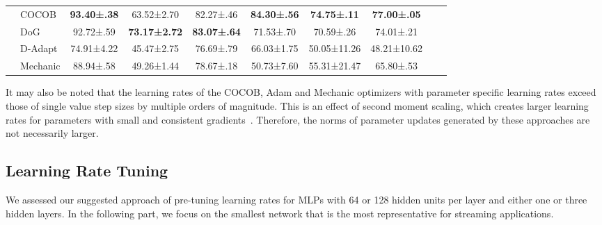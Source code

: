 \documentclass[runningheads]{llncs}
\begin{document}
\begin{table}[ht]
\begin{tabular}{llcccccccc}
		\multirow{4}{*}{\rotatebox[origin=c]{90}{LR-Free}} & COCOB                               \cite{orabonaTrainingDeepNetworks2017}        & \bfseries 93.40±.38 & 63.52±2.70           & 82.27±.46             & \bfseries 84.30±.56  & \bfseries 74.75±.11 & \bfseries 77.00±.05 \\
		                                                   & DoG \cite{ivgiDoGSGDBest2023}                                                     & 92.72±.59           & \bfseries 73.17±2.72 & \bfseries 83.07±.64   & 71.53±.70            & 70.59±.26           & 74.01±.21           \\
		                                                   & D-Adapt                    \cite{defazioLearningRateFreeLearningDAdaptation2023a} & 74.91±4.22          & 45.47±2.75           & 76.69±.79             & 66.03±1.75           & 50.05±11.26         & 48.21±10.62         \\
		                                                   & Mechanic \cite{cutkoskyMechanicLearningRate2023}                                  & 88.94±.58           & 49.26±1.44           & 78.67±.18             & 50.73±7.60           & 55.31±21.47         & 65.80±.53           \\
		\bottomrule
	\end{tabular}
	\label{tab:results_adaptive_optims}
\end{table}

It may also be noted that the learning rates of the COCOB, Adam and Mechanic optimizers with parameter specific learning rates exceed those of single value step sizes by multiple orders of magnitude.
This is an effect of second moment scaling, which creates larger learning rates for parameters with small and consistent gradients~\cite{cutkoskyMechanicLearningRate2023}.
Therefore, the norms of parameter updates generated by these approaches are not necessarily larger.


\subsection{Learning Rate Tuning}

We assessed our suggested approach of pre-tuning learning rates for MLPs with 64 or 128 hidden units per layer and either one or three hidden layers.
In the following part, we focus on the smallest network that is the most representative for streaming applications.
\end{document}
